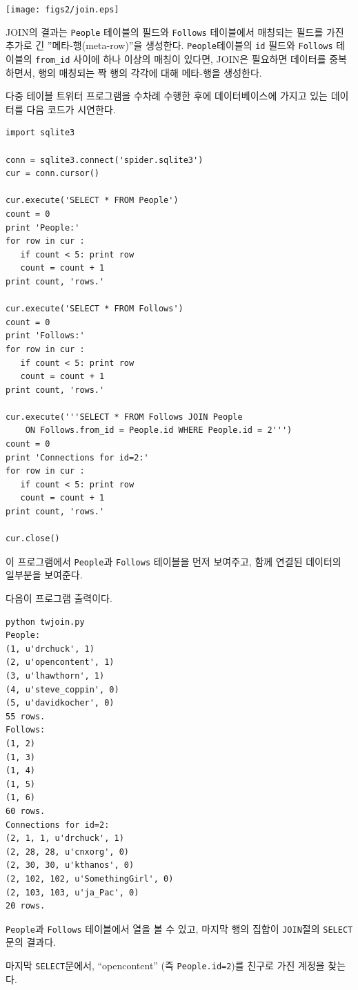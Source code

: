 \beforefig
\centerline{\texttt{[image: figs2/join.eps]}}
\afterfig

JOIN의 결과는 {\tt People} 테이블의 필드와 {\tt Follows} 테이블에서 매칭되는 필드를 가진 추가로 긴 ''메타-행(meta-row)''을 생성한다.
{\tt People}테이블의 {\tt id} 필드와 {\tt Follows} 테이블의 \verb"from_id" 사이에 하나 이상의 매칭이 있다면,
JOIN은 필요하면 데이터를 중복하면서, 행의 매칭되는 짝 행의 각각에 대해 메타-행을 생성한다.

다중 테이블 트위터 프로그램을 수차례 수행한 후에 데이터베이스에 가지고 있는 데이터를 다음 코드가 시연한다.

\beforeverb
\begin{verbatim}
import sqlite3

conn = sqlite3.connect('spider.sqlite3')
cur = conn.cursor()

cur.execute('SELECT * FROM People')
count = 0
print 'People:'
for row in cur :
   if count < 5: print row
   count = count + 1
print count, 'rows.'

cur.execute('SELECT * FROM Follows')
count = 0
print 'Follows:'
for row in cur :
   if count < 5: print row
   count = count + 1
print count, 'rows.'

cur.execute('''SELECT * FROM Follows JOIN People 
    ON Follows.from_id = People.id WHERE People.id = 2''')
count = 0
print 'Connections for id=2:'
for row in cur :
   if count < 5: print row
   count = count + 1
print count, 'rows.'

cur.close()
\end{verbatim}
\afterverb
%

이 프로그램에서 {\tt People}과 {\tt Follows} 테이블을 먼저 보여주고, 함께 연결된 데이터의 일부분을 보여준다.

다음이 프로그램 출력이다.

\beforeverb
\begin{verbatim}
python twjoin.py 
People:
(1, u'drchuck', 1)
(2, u'opencontent', 1)
(3, u'lhawthorn', 1)
(4, u'steve_coppin', 0)
(5, u'davidkocher', 0)
55 rows.
Follows:
(1, 2)
(1, 3)
(1, 4)
(1, 5)
(1, 6)
60 rows.
Connections for id=2:
(2, 1, 1, u'drchuck', 1)
(2, 28, 28, u'cnxorg', 0)
(2, 30, 30, u'kthanos', 0)
(2, 102, 102, u'SomethingGirl', 0)
(2, 103, 103, u'ja_Pac', 0)
20 rows.
\end{verbatim}
\afterverb
%

{\tt People}과 {\tt Follows} 테이블에서 열을 볼 수 있고, 마지막 행의 집합이 {\tt JOIN}절의 {\tt SELECT}문의 결과다.

마지막 {\tt SELECT}문에서, ``opencontent'' (즉 {\tt People.id=2})를 친구로 가진 계정을 찾는다.

